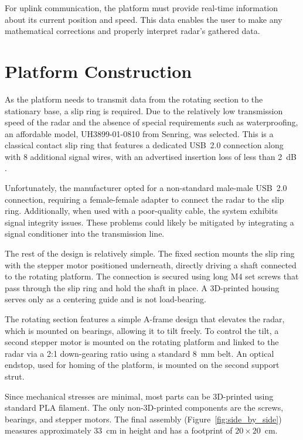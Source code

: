 For uplink communication, the platform must provide real-time information about its current position and speed.
This data enables the user to make any mathematical corrections and properly interpret radar's gathered data.


\section{Platform Construction}

As the platform needs to transmit data from the rotating section to the stationary base, a slip ring is required.
Due to the relatively low transmission speed of the radar and the absence of special requirements such as waterproofing, an affordable model, UH3899-01-0810 from Senring, was selected.
This is a classical contact slip ring that features a dedicated USB~2.0 connection along with 8 additional signal wires, with an advertised insertion loss of less than 2~dB \cite{slipring}.

Unfortunately, the manufacturer opted for a non-standard male-male USB~2.0 connection, requiring a female-female adapter to connect the radar to the slip ring.
Additionally, when used with a poor-quality cable, the system exhibits signal integrity issues.
These problems could likely be mitigated by integrating a signal conditioner into the transmission line.

The rest of the design is relatively simple.
The fixed section mounts the slip ring with the stepper motor positioned underneath, directly driving a shaft connected to the rotating platform.
The connection is secured using long M4 set screws that pass through the slip ring and hold the shaft in place.
A 3D-printed housing serves only as a centering guide and is not load-bearing.

The rotating section features a simple A-frame design that elevates the radar, which is mounted on bearings, allowing it to tilt freely.
To control the tilt, a second stepper motor is mounted on the rotating platform and linked to the radar via a 2:1 down-gearing ratio using a standard 8~mm belt.
An optical endstop, used for homing of the platform, is mounted on the second support strut.

Since mechanical stresses are minimal, most parts can be 3D-printed using standard PLA filament.
The only non-3D-printed components are the screws, bearings, and stepper motors.
The final assembly (Figure~\ref{fig:side_by_side}) measures approximately 33~cm in height and has a footprint of $20\times20$~cm.

